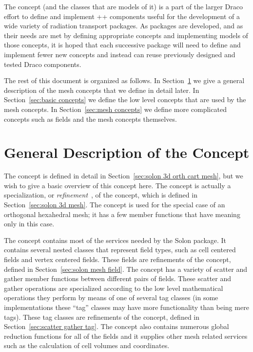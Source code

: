 \documentclass[note]{newmemo}
\begin{document}
The  concept (and the
classes that are models of it) is a
part of the larger Draco effort to define and implement \C++ components 
useful for the development of a wide variety of radiation transport
packages. As packages are developed, and as their needs are met by
defining appropriate concepts and implementing models of those
concepts, it is hoped that each successive package will need to define 
and implement fewer new concepts and instead can reuse previously
designed and tested Draco components.

The rest of this document is organized as follows. In
Section~\ref{sec:general description} we give a general description of 
the mesh concepts that we define in detail later. In
Section~\ref{sec:basic concepts} we define the low level concepts that 
are used by the mesh concepts. In Section~\ref{sec:mesh concepts} we
define more complicated concepts such as fields and the mesh concepts
themselves.


\section{General Description of the  Concept}
\label{sec:general description}

The  concept is defined in 
detail in Section~\ref{sec:solon 3d orth cart mesh}, but we wish to
give a basic overview of this
concept here. The  concept
is actually a specialization, or {\it refinement}~\cite{au99}, of the
 concept, which is defined in
Section~\ref{sec:solon 3d mesh}. The
 concept is used for the
special case of an orthogonal hexahedral mesh; it has a few member
functions that have meaning only in this case.

The  concept contains most of the services
needed by the Solon package. It contains several nested classes that
represent field types, such as cell centered fields and vertex
centered fields. These fields are refinements of the  concept, defined in Section~\ref{sec:solon mesh
  field}. The  concept has a variety of scatter and gather member functions
between different pairs of fields. These scatter and gather operations 
are specialized according to the low level mathematical operations
they perform by means of one of several tag classes (in some
implementations these ``tag'' classes may have more functionality than 
being mere tags). These tag classes are refinements of the
 concept, defined in
Section~\ref{sec:scatter gather tag}. The
 concept also contains numerous global
reduction functions for all of the fields and it supplies other mesh
related services such as the calculation of cell volumes and
coordinates.
\end{document}
